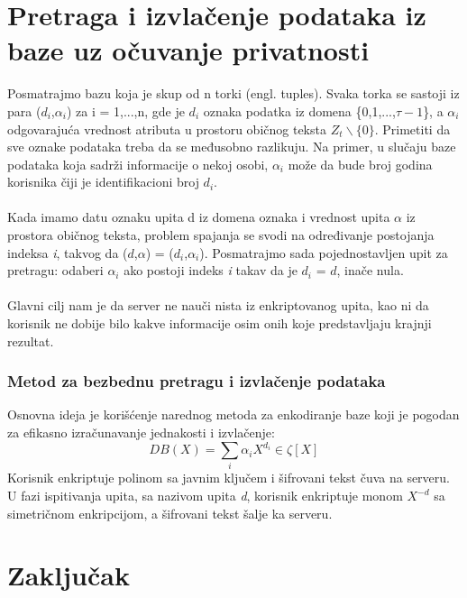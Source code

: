 \documentclass[a4paper]{article}
\begin{document}
\section{Pretraga i izvlačenje podataka iz baze uz očuvanje privatnosti}
Posmatrajmo bazu koja je skup od n torki (engl. tuples). Svaka torka se sastoji iz para ($d_i$,$\alpha_i$) za i = 1,...,n, gde je $d_i$ oznaka podatka iz domena \{0,1,...,$\tau-1$\}, a $\alpha_i$ odgovarajuća vrednost atributa u prostoru običnog teksta $Z_t \backslash \{0\}$. Primetiti da sve oznake podataka treba da se međusobno razlikuju. Na primer, u slučaju baze podataka koja sadrži informacije o nekoj osobi, $\alpha_i$ može da bude broj godina korisnika čiji je identifikacioni broj $d_i$.\\\\
Kada imamo datu oznaku upita d iz domena oznaka i vrednost upita $\alpha$ iz prostora običnog teksta, problem spajanja se svodi na određivanje postojanja indeksa \textit{i}, takvog da ($d$,$\alpha$) = ($d_i$,$\alpha_i$). Posmatrajmo sada pojednostavljen upit za pretragu: odaberi $\alpha_i$ ako postoji indeks \textit{i} takav da je $d_i$ = $d$, inače nula.\\\\
Glavni cilj nam je da server ne nauči nista iz enkriptovanog upita, kao ni da korisnik ne dobije bilo kakve informacije osim onih koje predstavljaju krajnji rezultat.
\subsubsection{Metod za bezbednu pretragu i izvlačenje podataka}
Osnovna ideja je korišćenje narednog metoda za enkodiranje baze koji je pogodan za efikasno izračunavanje jednakosti i izvlačenje:
	$$DB(X) = \sum_{i} \alpha_i X^{d_i} \in \zeta[X]$$ 
Korisnik enkriptuje polinom sa javnim ključem i šifrovani tekst čuva na serveru. U fazi ispitivanja upita, sa nazivom upita \textit{d}, korisnik enkriptuje monom $X^{-d}$ sa simetričnom enkripcijom, a šifrovani tekst šalje ka serveru.
\section{Zaključak}
\label{sec:zakljucak}


\appendix
 

\end{document}

